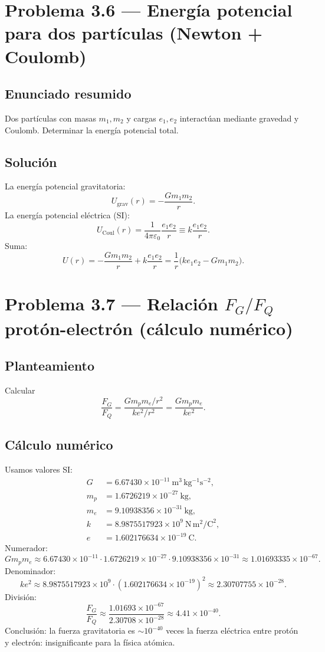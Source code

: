 \documentclass[12pt]{article}
\begin{document}
\section*{Problema 3.6 — Energía potencial para dos partículas (Newton + Coulomb)}
\subsection*{Enunciado resumido}
Dos partículas con masas \(m_1,m_2\) y cargas \(e_1,e_2\) interactúan mediante gravedad y Coulomb. Determinar la energía potencial total.

\subsection*{Solución}
La energía potencial gravitatoria:
\[
U_{\text{grav}}(r) = -\frac{G m_1 m_2}{r}.
\]
La energía potencial eléctrica (SI):
\[
U_{\text{Coul}}(r) = \frac{1}{4\pi\varepsilon_0}\frac{e_1 e_2}{r} \equiv k\frac{e_1 e_2}{r}.
\]
Suma:
\[
\boxed{U(r) = -\frac{G m_1 m_2}{r} + k\frac{e_1 e_2}{r} = \frac{1}{r}\bigl(k e_1 e_2 - G m_1 m_2\bigr).}
\]

\section*{Problema 3.7 — Relación \(F_G/F_Q\) protón-electrón (cálculo numérico)}
\subsection*{Planteamiento}
Calcular
\[
\frac{F_G}{F_Q} = \frac{G m_p m_e / r^2}{k e^2 / r^2} = \frac{G m_p m_e}{k e^2}.
\]

\subsection*{Cálculo numérico}
Usamos valores SI:
\[
\begin{aligned}
G &= 6.67430\times10^{-11}\ \mathrm{m^3\,kg^{-1}s^{-2}},\\
m_p &= 1.6726219\times10^{-27}\ \mathrm{kg},\\
m_e &= 9.10938356\times10^{-31}\ \mathrm{kg},\\
k &= 8.9875517923\times10^9\ \mathrm{N\,m^2/C^2},\\
e &= 1.602176634\times10^{-19}\ \mathrm{C}.
\end{aligned}
\]
Numerador:
\[
G m_p m_e \approx 6.67430\times10^{-11}\cdot 1.6726219\times10^{-27}\cdot 9.10938356\times10^{-31}
\approx 1.01693335\times10^{-67}.
\]
Denominador:
\[
k e^2 \approx 8.9875517923\times10^9\cdot(1.602176634\times10^{-19})^2
\approx 2.30707755\times10^{-28}.
\]
División:
\[
\frac{F_G}{F_Q} \approx \frac{1.01693\times10^{-67}}{2.30708\times10^{-28}}
\approx 4.41\times10^{-40}.
\]
Conclusión: la fuerza gravitatoria es \(\sim 10^{-40}\) veces la fuerza eléctrica entre protón y electrón: insignificante para la física atómica.
\end{document}
